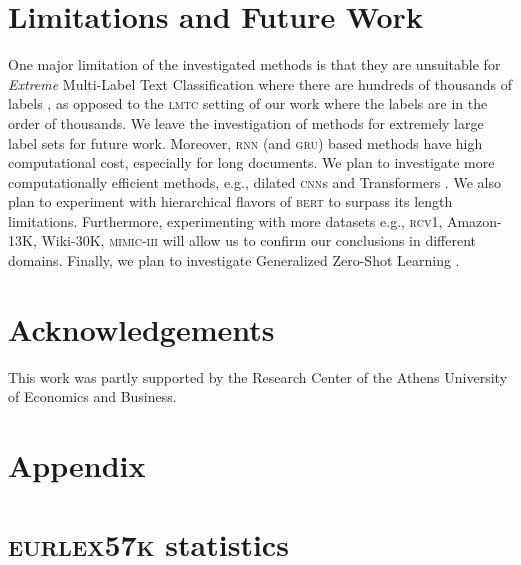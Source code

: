 \documentclass[11pt,a4paper]{article}
\newcommand{\gru}{\textsc{gru}\xspace}
\newcommand{\cnn}{\textsc{cnn}\xspace}
\newcommand{\lmtc}{\textsc{lmtc}\xspace}
\newcommand{\bert}{\textsc{bert}\xspace}
\newcommand{\newdata}{\textsc{eurlex57k}\xspace}
\newcommand{\rcv}{\textsc{rcv1}\xspace}
\newcommand{\mimiciii}{\textsc{mimic-iii}\xspace}
\begin{document}
\section{Limitations and Future Work}

One major limitation of the investigated methods is that they are unsuitable for \emph{Extreme} Multi-Label Text Classification where there are hundreds of thousands of labels \cite{Liu2017,Zhang2018,Wydmuch2018}, as opposed to the \lmtc setting of our work where the labels are in the order of thousands. We leave the investigation of methods for extremely large label sets for future work. Moreover, \textsc{rnn} (and \gru) based methods have high computational cost, especially for long documents. We plan to investigate more computationally efficient methods, e.g., dilated \cnn{s} \cite{KalchbrennerESO16} and Transformers \cite{Vaswani2017, Dai2019}. We also plan to experiment with hierarchical flavors of \bert to surpass its length limitations. Furthermore, experimenting with more datasets e.g., \rcv, Amazon-13K, Wiki-30K, \mimiciii will allow us to confirm our conclusions in different domains. Finally, we plan to investigate Generalized Zero-Shot Learning \cite{Liu2018}. 

\section*{Acknowledgements}
This work was partly supported by the Research Center of the Athens University of Economics and Business.

\vspace{-3mm}




\appendix
\section*{Appendix}

\section{\newdata statistics}
\label{app:dataset}
\end{document}
